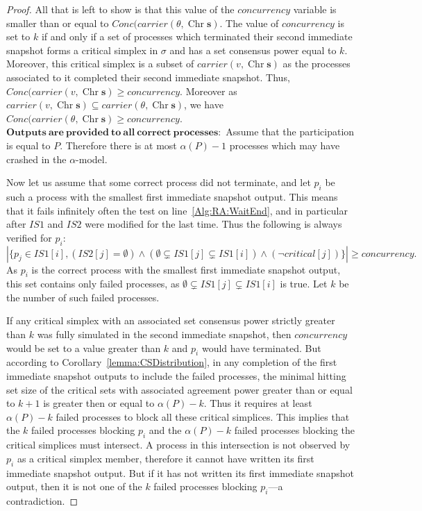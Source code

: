 \documentclass[a4paper]{article}
\def\s {\mathbf{s}}
\def\Chr{\operatorname{Chr}}
\def\Car{\mathit{carrier}}
\begin{document}
\begin{proof}
All that is left to show is that this value of the $\mathit{concurrency}$
variable is smaller than or equal to $\mathit{Conc}(\Car(\theta,\Chr\s)$.
The value of $\mathit{concurrency}$ is set to $k$ if and only if 
a set of processes which terminated their second immediate snapshot
forms a critical simplex in $\sigma$ and has a set consensus power
equal to $k$. Moreover, this critical simplex is a subset of
$\Car(v,\Chr\s)$ as the processes associated to it completed 
their second immediate snapshot. 
Thus, $\mathit{Conc}(\Car(v,\Chr\s)\geq\mathit{concurrency}$.
Moreover as $\Car(v,\Chr\s)\subseteq\Car(\theta,\Chr\s)$, we have
$\mathit{Conc}(\Car(\theta,\Chr\s)\geq\mathit{concurrency}$.
\\
\noindent $\mathbf{Outputs\ are\ provided\ to\ all\ correct\ processes: }$ Assume that the participation is equal to $P$. Therefore there is at most $\alpha(P)-1$ processes which may have crashed in the $\alpha$-model.

Now let us assume that some correct process did not terminate,
and let $p_i$ be such a process with the smallest first immediate
snapshot output.
This means that it fails infinitely often the test on line~\ref{Alg:RA:WaitEnd}, 
and in particular after $\mathit{IS1}$ and $\mathit{IS2}$ were modified for the
last time. Thus the following is always verified for $p_i$:
\[|\{p_j\in\mathit{IS1}[i], 
	(\mathit{IS2}[j]=\emptyset)\wedge
	(\emptyset\subsetneq \mathit{IS1}[j]\subsetneq\mathit{IS1}[i])\wedge
	(\neg \mathit{critical}[j])\}|\geq \mathit{concurrency}{}.\]
As $p_i$ is the correct process with the smallest first immediate snapshot output, 
this set contains only failed processes, as 
$\emptyset\subsetneq \mathit{IS1}[j]\subsetneq\mathit{IS1}[i]$ is true.
Let $k$ be the number of such failed processes. 

If any critical simplex with an associated set consensus power strictly
greater than $k$ was fully simulated in the second immediate snapshot,
then $\mathit{concurrency}$ would be set to a value greater than $k$ and 
$p_i$ would have terminated. But according to 
Corollary~\ref{lemma:CSDistribution}, in any completion
of the first immediate snapshot outputs to include the failed processes,
the minimal hitting set size of the critical sets with associated agreement
power greater than or equal to $k+1$ is greater then or equal to $\alpha(P)-k$.
Thus it requires at least $\alpha(P)-k$ failed processes to block all these 
critical simplices. This implies that the $k$ failed processes blocking $p_i$
and the $\alpha(P)-k$ failed processes blocking the critical simplices 
must intersect. A process in this intersection is not observed by $p_i$ as a critical simplex
member, therefore it cannot have written its first immediate snapshot output.
But if it has not written its first immediate snapshot output, then it is not 
one of the $k$ failed processes blocking $p_i$---a contradiction. 
\end{proof}
\end{document}
